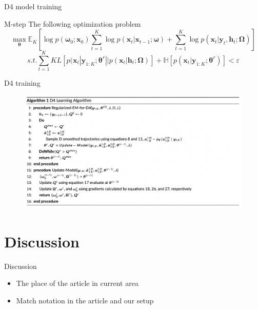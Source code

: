 \documentclass{beamer}
\begin{document}
\begin{frame}{D4 model training}
    \begin{block}{M-step}
        The following optimization problem
        $$\max_{\boldsymbol{\theta}}\mathbb{E}_K [\log p (\boldsymbol{\omega}_0; \boldsymbol{x}_0) \sum_{t=1}^K \log p (\boldsymbol{x}_t | \boldsymbol{x}_{t-1}; \boldsymbol{\omega}) + \sum_{t=1}^K \log p (\boldsymbol{x}_t | \boldsymbol{y}_{t}, \boldsymbol{h}_{t}; \boldsymbol{\Omega})]$$
        $$s.t. \sum_{t=1}^K KL\left[p (\boldsymbol{x}_t | \boldsymbol{y}_{1:K}; \boldsymbol{\theta}^r || p (\boldsymbol{x}_t | \boldsymbol{h}_{t}; \boldsymbol{\Omega}) \right] + \mathbb{H} \left[p (\boldsymbol{x}_t | \boldsymbol{y}_{1:K}; \boldsymbol{\theta}^r) \right] < \varepsilon$$
    \end{block}
    
\end{frame}
\begin{frame}{D4 training}
    \begin{figure}
        \centering
        \includegraphics[scale=0.4]{D4_alg.png}
    \end{figure}
\end{frame}

\section{Discussion}

\begin{frame}{Discussion}
    \begin{itemize}
        \item The place of the article in current area
        \item Match notation in the article and our setup
    \end{itemize}
\end{frame}
\end{document}
